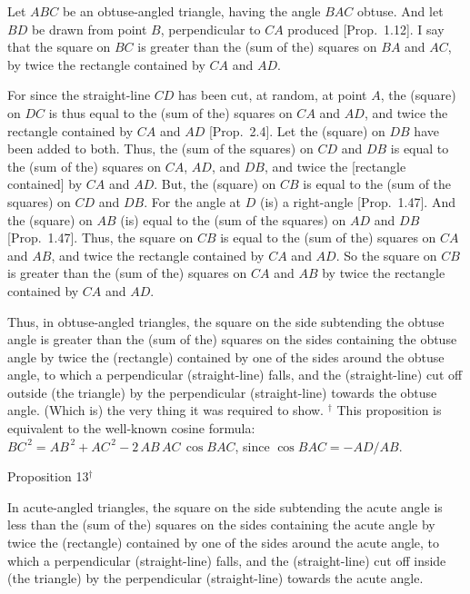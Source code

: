  Let $ABC$ be an obtuse-angled triangle, having the 
 angle $BAC$ obtuse. And let $BD$ be drawn from point $B$, perpendicular
 to $CA$ produced [Prop.~1.12]. I say that the square on $BC$ is greater than the
 (sum of the) squares on $BA$ and $AC$, by twice the rectangle contained
 by $CA$ and $AD$.
 
 For since the straight-line $CD$ has been cut, at random, at point $A$, 
 the (square) on $DC$ is thus equal to the (sum of the) squares on $CA$ and $AD$,
 and twice the rectangle contained by $CA$ and $AD$ [Prop.~2.4]. Let
 the (square) on $DB$ have been added to both. Thus, the
 (sum of the squares) on $CD$ and $DB$ is equal to the (sum of the) squares
 on $CA$, $AD$, and $DB$, and twice the [rectangle contained] by $CA$ and $AD$.
 But, the (square) on
 $CB$ is equal to the (sum of the squares) on $CD$ and $DB$. For the angle at $D$ (is) a right-angle [Prop.~1.47]. And  the (square) on 
 $AB$ (is) equal to the (sum of the
 squares) on $AD$ and $DB$  [Prop.~1.47]. Thus, the square on $CB$ is equal to the (sum of the)
 squares on $CA$ and $AB$, and twice the rectangle contained by $CA$ and $AD$.  So the square on $CB$ is greater than the (sum of the) squares on $CA$ and
 $AB$ by twice the rectangle contained by $CA$ and $AD$.
 
Thus, in  obtuse-angled triangles, the square on the side subtending the obtuse
angle is greater than the (sum of the) squares on the sides containing the obtuse angle
by twice the (rectangle) contained by one of the sides around the obtuse
angle, to which a perpendicular (straight-line) falls, and the 
 (straight-line) cut off outside (the triangle)
 by the perpendicular (straight-line) towards the obtuse angle.
 (Which is) the very thing it was required to show.
{\footnotesize \noindent$^\dag$ This proposition is equivalent
to the well-known cosine formula: $BC^{\,2} = AB^{\,2} + AC^{\,2} -2\,AB\,AC\,\cos BAC$, since $\cos BAC = - AD / AB$.}


\begin{center}
{\large Proposition 13$^\dag$}
\end{center}

In acute-angled triangles, the square on the side subtending the acute angle
is less than the (sum of the) squares on the sides containing the acute
angle by twice the (rectangle) contained by one of the sides around the acute
angle, to which a perpendicular (straight-line) falls, and the 
 (straight-line) cut off inside (the triangle)
 by the perpendicular (straight-line) towards the acute angle.
 
